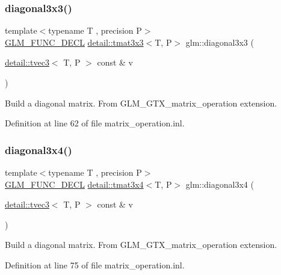 \subsubsection{\texorpdfstring{diagonal3x3()}{diagonal3x3()}}
{\footnotesize\ttfamily template$<$typename T , precision P$>$ \\
\hyperlink{setup_8hpp_ab2d052de21a70539923e9bcbf6e83a51}{G\+L\+M\+\_\+\+F\+U\+N\+C\+\_\+\+D\+E\+CL} \hyperlink{structglm_1_1detail_1_1tmat3x3}{detail\+::tmat3x3}$<$T, P$>$ glm\+::diagonal3x3 (\begin{DoxyParamCaption}\item[{\hyperlink{structglm_1_1detail_1_1tvec3}{detail\+::tvec3}$<$ T, P $>$ const \&}]{v }\end{DoxyParamCaption})}

Build a diagonal matrix. From G\+L\+M\+\_\+\+G\+T\+X\+\_\+matrix\+\_\+operation extension. 

Definition at line 62 of file matrix\+\_\+operation.\+inl.

\mbox{\label{group__gtx__matrix__operation_gab96c533557a191bd972300868f8111ef}} 
\subsubsection{\texorpdfstring{diagonal3x4()}{diagonal3x4()}}
{\footnotesize\ttfamily template$<$typename T , precision P$>$ \\
\hyperlink{setup_8hpp_ab2d052de21a70539923e9bcbf6e83a51}{G\+L\+M\+\_\+\+F\+U\+N\+C\+\_\+\+D\+E\+CL} \hyperlink{structglm_1_1detail_1_1tmat3x4}{detail\+::tmat3x4}$<$T, P$>$ glm\+::diagonal3x4 (\begin{DoxyParamCaption}\item[{\hyperlink{structglm_1_1detail_1_1tvec3}{detail\+::tvec3}$<$ T, P $>$ const \&}]{v }\end{DoxyParamCaption})}

Build a diagonal matrix. From G\+L\+M\+\_\+\+G\+T\+X\+\_\+matrix\+\_\+operation extension. 

Definition at line 75 of file matrix\+\_\+operation.\+inl.

\mbox{\label{group__gtx__matrix__operation_ga1ec0fc953d871fc9894bcfcc81dbaf68}} 
